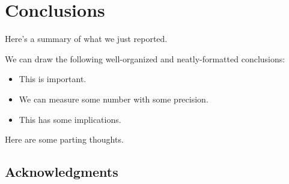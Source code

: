 \documentclass[\docopts]{\docclass}
\begin{document}

\section{Conclusions}
\label{sec:conclusions}

Here's a summary of what we just reported.

We can draw the following well-organized and neatly-formatted conclusions:
\begin{itemize}
  \item This is important.
  \item We can measure some number with some precision.
  \item This has some implications.
\end{itemize}

Here are some parting thoughts.



\subsection*{Acknowledgments}





\end{document}
